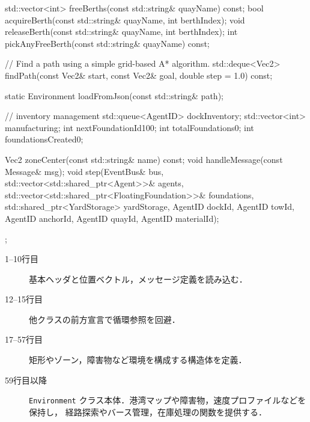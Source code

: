 \documentclass[10pt,letterpaper]{jsarticle}
\begin{document}
\begin{cppcode}
{    std::vector<int> freeBerths(const std::string& quayName) const;
    bool acquireBerth(const std::string& quayName, int berthIndex);
    void releaseBerth(const std::string& quayName, int berthIndex);
    int pickAnyFreeBerth(const std::string& quayName) const;

    // Find a path using a simple grid-based A* algorithm.
    std::deque<Vec2> findPath(const Vec2& start, const Vec2& goal, double step = 1.0) const;

    static Environment loadFromJson(const std::string& path);

    // inventory management
    std::queue<AgentID> dockInventory;
    std::vector<int> manufacturing;
    int nextFoundationId{100};
    int totalFoundations{0};
    int foundationsCreated{0};

    Vec2 zoneCenter(const std::string& name) const;
    void handleMessage(const Message& msg);
    void step(EventBus& bus,
              std::vector<std::shared_ptr<Agent>>& agents,
              std::vector<std::shared_ptr<FloatingFoundation>>& foundations,
              std::shared_ptr<YardStorage> yardStorage,
              AgentID dockId, AgentID towId, AgentID anchorId,
              AgentID quayId, AgentID materialId);
};
\end{cppcode}
\begin{description}
  \item[1--10行目] 基本ヘッダと位置ベクトル，メッセージ定義を読み込む．
  \item[12--15行目] 他クラスの前方宣言で循環参照を回避．
  \item[17--57行目] 矩形やゾーン，障害物など環境を構成する構造体を定義．
  \item[59行目以降] \texttt{Environment} クラス本体．港湾マップや障害物，速度プロファイルなどを保持し，
                   経路探索やバース管理，在庫処理の関数を提供する．
\end{description}
\end{document}
